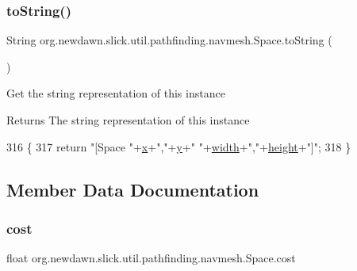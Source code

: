\subsubsection{\texorpdfstring{to\+String()}{toString()}}
{\footnotesize\ttfamily String org.\+newdawn.\+slick.\+util.\+pathfinding.\+navmesh.\+Space.\+to\+String (\begin{DoxyParamCaption}{ }\end{DoxyParamCaption})\hspace{0.3cm}{\ttfamily [inline]}}

Get the string representation of this instance

\begin{DoxyReturn}{Returns}
The string representation of this instance 
\end{DoxyReturn}

\begin{DoxyCode}
316                              \{
317         \textcolor{keywordflow}{return} \textcolor{stringliteral}{"[Space "}+\mbox{\hyperlink{classorg_1_1newdawn_1_1slick_1_1util_1_1pathfinding_1_1navmesh_1_1_space_a314d8d0ed7351fbaaa0a191464e26bfc}{x}}+\textcolor{stringliteral}{","}+\mbox{\hyperlink{classorg_1_1newdawn_1_1slick_1_1util_1_1pathfinding_1_1navmesh_1_1_space_ad394b749482835dc1430efff0321010e}{y}}+\textcolor{stringliteral}{" "}+\mbox{\hyperlink{classorg_1_1newdawn_1_1slick_1_1util_1_1pathfinding_1_1navmesh_1_1_space_a503d0a0778ebcb12877f5c432aa97698}{width}}+\textcolor{stringliteral}{","}+\mbox{\hyperlink{classorg_1_1newdawn_1_1slick_1_1util_1_1pathfinding_1_1navmesh_1_1_space_a2214b5226eed20766ff61fc3f9803a58}{height}}+\textcolor{stringliteral}{"]"};
318     \}
\end{DoxyCode}


\subsection{Member Data Documentation}
\mbox{\label{classorg_1_1newdawn_1_1slick_1_1util_1_1pathfinding_1_1navmesh_1_1_space_a9807ff26ac70231463426ebbaf4b8dac}} 
\subsubsection{\texorpdfstring{cost}{cost}}
{\footnotesize\ttfamily float org.\+newdawn.\+slick.\+util.\+pathfinding.\+navmesh.\+Space.\+cost\hspace{0.3cm}{\ttfamily [private]}}

